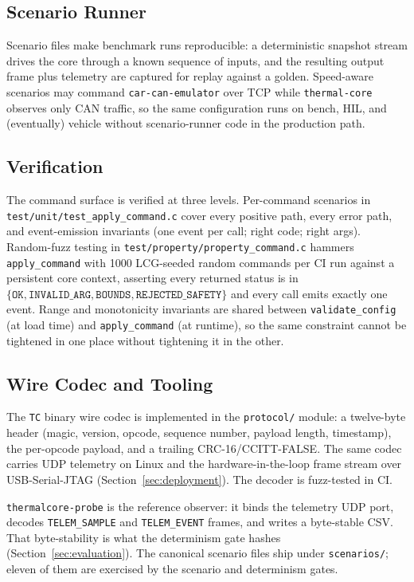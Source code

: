 \subsection{Scenario Runner}

Scenario files make benchmark runs reproducible: a deterministic snapshot stream drives the core through a known sequence of inputs, and the resulting output frame plus telemetry are captured for replay against a golden. Speed-aware scenarios may command \texttt{car-can-emulator} over TCP while \texttt{thermal-core} observes only CAN traffic, so the same configuration runs on bench, HIL, and (eventually) vehicle without scenario-runner code in the production path.

\subsection{Verification}

The command surface is verified at three levels. Per-command scenarios in \texttt{test/unit/test\_apply\_command.c} cover every positive path, every error path, and event-emission invariants (one event per call; right code; right args). Random-fuzz testing in \texttt{test/property/property\_command.c} hammers \texttt{apply\_command} with 1000 LCG-seeded random commands per CI run against a persistent core context, asserting every returned status is in \(\{\texttt{OK}, \texttt{INVALID\_ARG}, \texttt{BOUNDS}, \texttt{REJECTED\_SAFETY}\}\) and every call emits exactly one event. Range and monotonicity invariants are shared between \texttt{validate\_config} (at load time) and \texttt{apply\_command} (at runtime), so the same constraint cannot be tightened in one place without tightening it in the other.

\subsection{Wire Codec and Tooling}

The \texttt{TC} binary wire codec is implemented in the \texttt{protocol/} module: a twelve-byte header (magic, version, opcode, sequence number, payload length, timestamp), the per-opcode payload, and a trailing CRC-16/CCITT-FALSE. The same codec carries UDP telemetry on Linux and the hardware-in-the-loop frame stream over USB-Serial-JTAG (Section~\ref{sec:deployment}). The decoder is fuzz-tested in CI.

\texttt{thermalcore-probe} is the reference observer: it binds the telemetry UDP port, decodes \texttt{TELEM\_SAMPLE} and \texttt{TELEM\_EVENT} frames, and writes a byte-stable CSV. That byte-stability is what the determinism gate hashes (Section~\ref{sec:evaluation}). The canonical scenario files ship under \texttt{scenarios/}; eleven of them are exercised by the scenario and determinism gates.

\endinput
